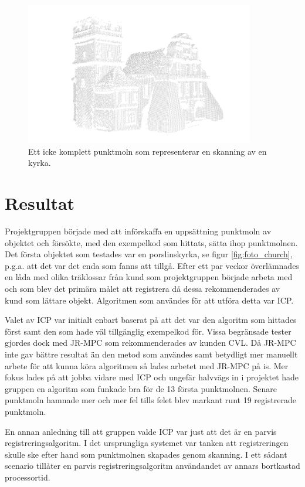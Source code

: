 \begin{figure}[H]
	\centering
	\includegraphics[width=100mm]{figures/icke_komplett_moln_kyrka.png}
	\caption{Ett icke komplett punktmoln som representerar en skanning av en kyrka.}
	\label{fig:karlsson-single_scan-church}
\end{figure}


\section{Resultat}
\label{sec:results-karlsson}

Projektgruppen började med att införskaffa en uppsättning punktmoln av objektet och försökte, med den exempelkod som hittats, sätta ihop punktmolnen. Det första objektet som testades var en porslinskyrka, se figur \ref{fig:foto_church}, p.g.a. att det var det enda som fanns att tillgå. Efter ett par veckor överlämnades en låda med olika träklossar från kund som projektgruppen började arbeta med och som blev det primära målet att registrera då dessa rekommenderades av kund som lättare objekt. Algoritmen som användes för att utföra detta var ICP. 

Valet av ICP var initialt enbart baserat på att det var den algoritm som hittades först samt den som hade väl tillgänglig exempelkod för. Vissa begränsade tester gjordes dock med JR-MPC som rekommenderades av kunden CVL. Då JR-MPC inte gav bättre resultat än den metod som användes samt betydligt mer manuellt arbete för att kunna köra algoritmen så lades arbetet med JR-MPC på is. Mer fokus lades på att jobba vidare med ICP och ungefär halvvägs in i projektet hade gruppen en algoritm som funkade bra för de 13 första punktmolnen. Senare punktmoln hamnade mer och mer fel tills felet blev markant runt 19 registrerade punktmoln. 

En annan anledning till att gruppen valde ICP var just att det är en parvis registreringsalgoritm. I det ursprungliga systemet var tanken att registreringen skulle ske efter hand som punktmolnen skapades genom skanning. I ett sådant scenario tillåter en parvis registreringsalgoritm användandet av annars bortkastad processortid.

